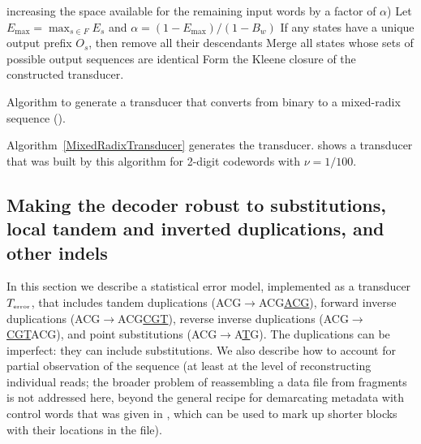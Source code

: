 \documentclass[english]{article}
\begin{document}
\begin{algorithm}
{{                  increasing the space available for the remaining input words by a factor of $\alpha$)}
          \;
          Let $E_{\max} = \max_{s \in F} E_s$ and $\alpha = (1 - E_{\max}) / (1 - B_w)$
          \;
        }
    If any states have a unique output prefix $O_s$, then remove all their descendants
        \;
        Merge all states whose sets of possible output sequences are identical
        \;
        Form the Kleene closure of the constructed transducer.
\caption{
  \label{MixedRadixTransducer}
  Algorithm to generate a transducer that converts from binary to a mixed-radix sequence
  ().
}
\end{algorithm}

Algorithm~\ref{MixedRadixTransducer} generates the transducer.
 shows a transducer that was built by this algorithm
for 2-digit codewords with $\nu=1/100$.



\subsection{Making the decoder robust to substitutions, local tandem and inverted duplications, and other indels}

In this section we describe a statistical error model,
implemented as a transducer $T_{\mbox{\tiny error}}$,
that includes
tandem duplications (ACG$\to$ACG\underline{ACG}),
forward inverse duplications (ACG$\to$ACG\underline{CGT}),
reverse inverse duplications (ACG$\to$\underline{CGT}ACG),
and point substitutions (ACG$\to$A\underline{T}G).
The duplications can be imperfect: they can include substitutions.
We also describe how to account for partial observation of the sequence
(at least at the level of reconstructing individual reads;
the broader problem of reassembling a data file from fragments is not addressed here,
beyond the general recipe for demarcating metadata with control words
that was given in , which can be used to mark up shorter blocks
with their locations in the file).
\end{document}
